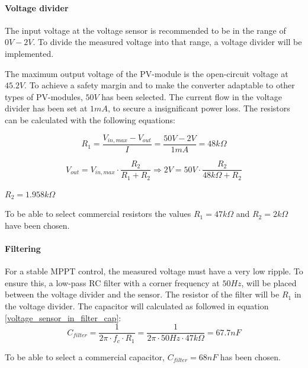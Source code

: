 \paragraph{Voltage divider}
The input voltage at the voltage sensor is recommended to be in the range of $0V-2V$. To divide the measured voltage into that range, a voltage divider will be implemented. 

The maximum output voltage of the PV-module is the open-circuit voltage at $45.2V$. To achieve a safety margin and to make the converter adaptable to other types of PV-modules, $50V$ has been selected. The current flow in the voltage divider has been set at $1mA$, to secure a insignificant power loss. The resistors can be calculated with the following equations:

\begin{equation} \label{voltage_divider_R17_in}
	R_{1} = \frac{V_{in,max}-V_{out}}{I} = \frac{50V-2V}{1mA} = 48k\Omega
\end{equation}

\begin{equation} \label{voltage_divider_R18_in}
	V_{out} = V_{in,max} \cdot \frac{R_{2}}{R_{1}+R_{2}} \Rightarrow 2V = 50V \cdot \frac{R_{2}}{48k\Omega+R_{2}}
\end{equation}
\begin{center}
	$R_{2} = 1.958k\Omega$
\end{center}

To be able to select commercial resistors the values $R_{1} = 47k\Omega$ and $R_{2} = 2k\Omega$ have been chosen. 

\paragraph{Filtering} \label{voltage_sensor_filter}
For a stable MPPT control, the measured voltage must have a very low ripple. To ensure this, a low-pass RC filter with a corner frequency at $50Hz$, will be placed between the voltage divider and the sensor. The resistor of the filter will be $R_{1}$ in the voltage divider. The capacitor will calculated as followed in equation \ref{voltage_sensor_in_filter_cap}:
\begin{equation} \label{voltage_sensor_in_filter_cap}
	C_{filter} = \frac{1}{2\pi \cdot f_c \cdot R_{1}} = \frac{1}{2 \pi \cdot 50Hz \cdot 47k\Omega} = 67.7nF
\end{equation}

\noindent To be able to select a commercial capacitor, $C_{filter} = 68nF$ has been chosen. 

